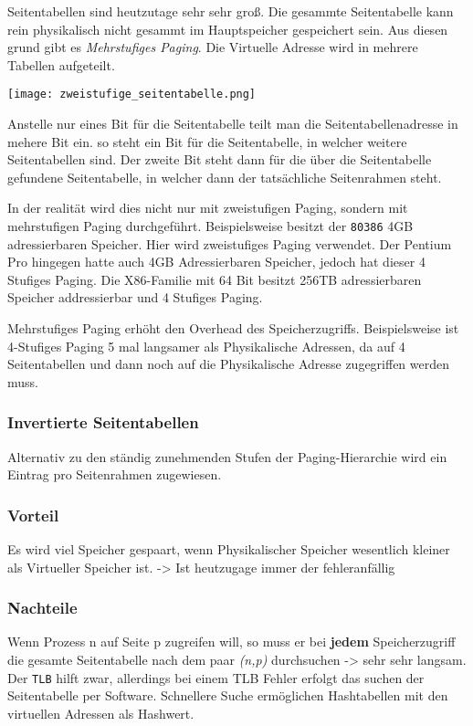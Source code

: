 Seitentabellen sind heutzutage sehr sehr groß. Die gesammte Seitentabelle kann rein physikalisch nicht gesammt im Hauptspeicher gespeichert sein. Aus diesen grund gibt es \textit{Mehrstufiges Paging}. Die Virtuelle Adresse wird in mehrere Tabellen aufgeteilt.

\texttt{[image: zweistufige\_seitentabelle.png]}

Anstelle nur eines Bit für die Seitentabelle teilt man die Seitentabellenadresse in mehere Bit ein. so steht ein Bit für die Seitentabelle, in welcher weitere Seitentabellen sind. Der zweite Bit steht dann für die über die Seitentabelle gefundene Seitentabelle, in welcher dann der tatsächliche Seitenrahmen steht.

In der realität wird dies nicht nur mit zweistufigen Paging, sondern mit mehrstufigen Paging durchgeführt. Beispielsweise besitzt der \texttt{80386} 4GB adressierbaren Speicher. Hier wird zweistufiges Paging verwendet. Der Pentium Pro hingegen hatte auch 4GB Adressierbaren Speicher, jedoch hat dieser 4 Stufiges Paging. Die X86-Familie mit 64 Bit besitzt 256TB adressierbaren Speicher addressierbar und 4  Stufiges Paging.

Mehrstufiges Paging erhöht den Overhead des Speicherzugriffs. Beispielsweise ist 4-Stufiges Paging 5 mal langsamer als Physikalische Adressen, da auf 4 Seitentabellen und dann noch auf die Physikalische Adresse zugegriffen werden muss.

\subsubsection{Invertierte Seitentabellen}

Alternativ zu den ständig zunehmenden Stufen der Paging-Hierarchie wird ein Eintrag pro Seitenrahmen zugewiesen. 

\subsubsection*{Vorteil}

Es wird viel Speicher gespaart, wenn Physikalischer Speicher wesentlich kleiner als Virtueller Speicher ist. -> Ist heutzugage immer der fehleranfällig

\subsubsection*{Nachteile}

Wenn Prozess n auf Seite p zugreifen will, so muss er bei \textbf{jedem} Speicherzugriff die gesamte Seitentabelle nach dem paar \textit{(n,p)} durchsuchen -> sehr sehr langsam. Der \texttt{TLB} hilft zwar, allerdings bei einem TLB Fehler erfolgt das suchen der Seitentabelle per Software. Schnellere Suche ermöglichen Hashtabellen mit den virtuellen Adressen als Hashwert. 

